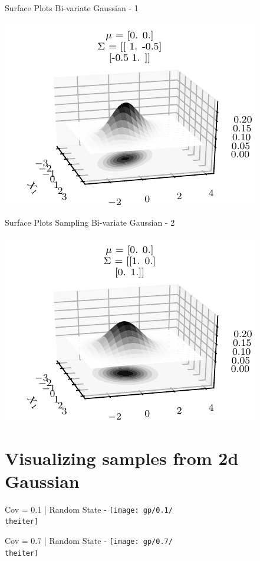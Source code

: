 \documentclass{beamer}
\begin{document}
\begin{frame}{Surface Plots Bi-variate Gaussian - 1}
	\begin{center}
		\includegraphics[height=\textheight -10pt ,keepaspectratio]{gp/2dgp3d}
	\end{center}
\end{frame}

\begin{frame}{Surface Plots Sampling Bi-variate Gaussian - 2}
	\begin{center}
		\includegraphics[height=\textheight -10pt ,keepaspectratio]{gp/2dgp3d2}
	\end{center}
\end{frame}

\section{Visualizing samples from 2d Gaussian}

%
{%
	\begin{frame}{Cov = 0.1 | Random State - \theiter}
		\texttt{[image: gp/0.1/\\theiter]}
	\end{frame}
}
%
{%
	\begin{frame}{Cov = 0.7 | Random State - \theiter}
		\texttt{[image: gp/0.7/\\theiter]}
	\end{frame}
}
\end{document}
